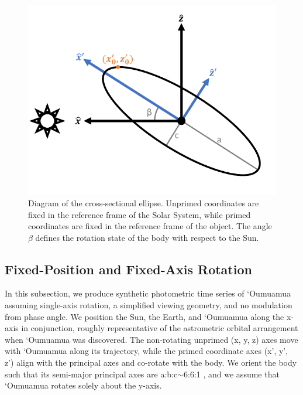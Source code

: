 \documentclass[twocolumn,doublespacing]{aastex631}
\begin{document}
\begin{figure}
\centering
\includegraphics[width=\linewidth,angle=0]{cross_section_ellipse.pdf}
\caption{Diagram of the cross-sectional ellipse. Unprimed coordinates are fixed in the reference frame of the Solar System, while primed coordinates are fixed in the reference frame of the object. The angle $\beta$ defines the rotation state of the body with respect to the Sun. }
\label{fig:ell-cross-section}
\end{figure}

\subsection{Fixed-Position and Fixed-Axis Rotation}\label{sec:simplemodel}

In this subsection, we produce synthetic photometric time series of `Oumuamua assuming single-axis rotation, a simplified viewing geometry, and no modulation from phase angle. We position the Sun, the Earth, and `Oumuamua along the x-axis in conjunction, roughly representative of the astrometric orbital arrangement when `Oumuamua was discovered. The non-rotating unprimed (x, y, z) axes move with `Oumuamua along its trajectory, while the primed coordinate axes (x', y', z') align with the principal axes and co-rotate with the body. We orient the body such that its semi-major principal axes are a:b:c$\sim$6:6:1 \citep{mashchenko2019}, and we assume that `Oumuamua rotates solely about the y-axis. 
\end{document}
